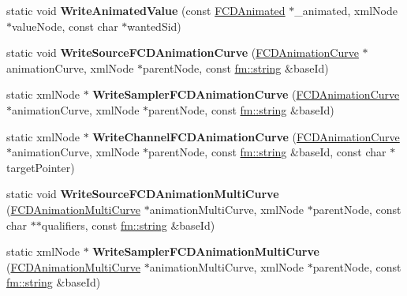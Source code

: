 \begin{DoxyCompactItemize}
\item 
\hypertarget{classFArchiveXML_ab5b9b9b9f6fcbc63dac0d59069c1d5c3}{
static void {\bfseries WriteAnimatedValue} (const \hyperlink{classFCDAnimated}{FCDAnimated} $\ast$\_\-animated, xmlNode $\ast$valueNode, const char $\ast$wantedSid)}
\label{classFArchiveXML_ab5b9b9b9f6fcbc63dac0d59069c1d5c3}

\item 
\hypertarget{classFArchiveXML_a7eb51648ebca63761f8e5030f7ff4f52}{
static void {\bfseries WriteSourceFCDAnimationCurve} (\hyperlink{classFCDAnimationCurve}{FCDAnimationCurve} $\ast$animationCurve, xmlNode $\ast$parentNode, const \hyperlink{classfm_1_1stringT}{fm::string} \&baseId)}
\label{classFArchiveXML_a7eb51648ebca63761f8e5030f7ff4f52}

\item 
\hypertarget{classFArchiveXML_a0581e30d1e2b17decc1a8646906c5667}{
static xmlNode $\ast$ {\bfseries WriteSamplerFCDAnimationCurve} (\hyperlink{classFCDAnimationCurve}{FCDAnimationCurve} $\ast$animationCurve, xmlNode $\ast$parentNode, const \hyperlink{classfm_1_1stringT}{fm::string} \&baseId)}
\label{classFArchiveXML_a0581e30d1e2b17decc1a8646906c5667}

\item 
\hypertarget{classFArchiveXML_a524dee9545f60b2969d6345585d6bd5e}{
static xmlNode $\ast$ {\bfseries WriteChannelFCDAnimationCurve} (\hyperlink{classFCDAnimationCurve}{FCDAnimationCurve} $\ast$animationCurve, xmlNode $\ast$parentNode, const \hyperlink{classfm_1_1stringT}{fm::string} \&baseId, const char $\ast$targetPointer)}
\label{classFArchiveXML_a524dee9545f60b2969d6345585d6bd5e}

\item 
\hypertarget{classFArchiveXML_a09423d223ef4e13a54fff41ded45ea40}{
static void {\bfseries WriteSourceFCDAnimationMultiCurve} (\hyperlink{classFCDAnimationMultiCurve}{FCDAnimationMultiCurve} $\ast$animationMultiCurve, xmlNode $\ast$parentNode, const char $\ast$$\ast$qualifiers, const \hyperlink{classfm_1_1stringT}{fm::string} \&baseId)}
\label{classFArchiveXML_a09423d223ef4e13a54fff41ded45ea40}

\item 
\hypertarget{classFArchiveXML_ab7d6348f3670dede6b5d4c74b624bf3a}{
static xmlNode $\ast$ {\bfseries WriteSamplerFCDAnimationMultiCurve} (\hyperlink{classFCDAnimationMultiCurve}{FCDAnimationMultiCurve} $\ast$animationMultiCurve, xmlNode $\ast$parentNode, const \hyperlink{classfm_1_1stringT}{fm::string} \&baseId)}
\label{classFArchiveXML_ab7d6348f3670dede6b5d4c74b624bf3a}


\end{DoxyCompactItemize}

